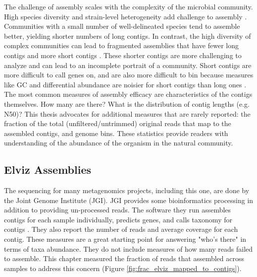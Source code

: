 The challenge of assembly scales with the complexity of the microbial community.
High species diversity and strain-level heterogeneity add challenge to assembly \cite{kunin2008, thomas2012}.
Communities with a small number of well-delineated species tend to assemble better, yielding shorter numbers of long contigs.
In contrast, the high diversity of complex communities can lead to fragmented assemblies that have fewer long contigs and more short contigs \cite{kunin2008}.
These shorter contigs are more challenging to analyze and can lead to an incomplete portrait of a community.
Short contigs are more difficult to call genes on, and are also more difficult to bin because measures like GC and differential abundance are noisier for short contigs than long ones \cite{sangwan2016}.
The most common measures of assembly efficacy are characteristics of the contigs themselves.  How many are there?  %
What is the distribution of contig lengths (e.g. N50)?
This thesis advocates for additional measures that are rarely reported: the fraction of the total (unfiltered/untrimmed) original reads that map to the assembled contigs, and genome bins.
These statistics provide readers with understanding of the abundance of the organism in the natural community.

\subsection{Elviz Assemblies}   %
The sequencing for many metagenomics projects, including this one, are done by the Joint Genome Institute (JGI).
JGI provides some bioinformatics processing in addition to providing un-processed reads.
The software they run assembles contigs for each sample individually, predicts genes, and calls taxonomy for contigs \cite{cantor2015}.
They also report the number of reads and average coverage for each contig.
These measures are a great starting point for answering "who's there" in terms of taxa abundance.
They do not include measures of how many reads failed to assemble.
This chapter measured the fraction of reads that assembled across samples to address this concern (Figure \ref{fig:frac_elviz_mapped_to_contigs}).

